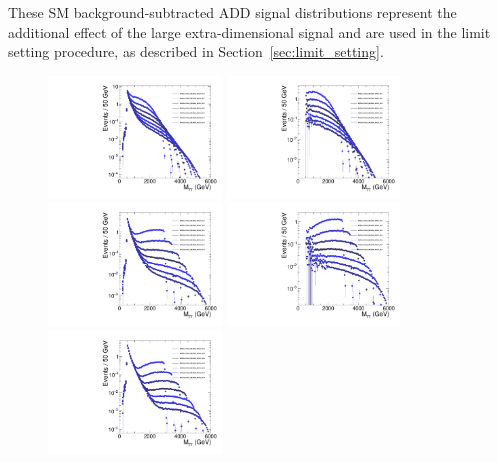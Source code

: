 These SM background-subtracted ADD signal distributions represent the additional effect of the large extra-dimensional signal and are used in the limit setting procedure, as described in Section~\ref{sec:limit_setting}.

\begin{figure}[tbp!]
  \centering
	\includegraphics[angle=0,width=0.41\textwidth]{figures/ADDGravToGG_NED-2_KK-1.pdf}
	\includegraphics[angle=0,width=0.41\textwidth]{figures/ADDGravToGG_NED-2_KK-1_bkg_sub.pdf}
	\includegraphics[angle=0,width=0.41\textwidth]{figures/ADDGravToGG_NED-4_KK-1.pdf}
	\includegraphics[angle=0,width=0.41\textwidth]{figures/ADDGravToGG_NED-4_KK-1_bkg_sub.pdf}
	\includegraphics[angle=0,width=0.41\textwidth]{figures/ADDGravToGG_NED-2_KK-4.pdf}

\end{figure}
